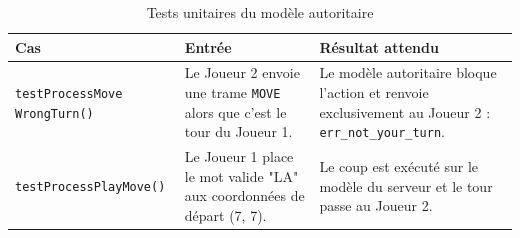 \documentclass[a4paper]{article}
\begin{document}
\begin{table}[H]
    \centering
    \small
    \begin{tabular}{p{4.5cm} p{4.5cm} p{5.5cm}}
        \toprule
        \textbf{Cas} & \textbf{Entrée} & \textbf{Résultat attendu} \\
        \midrule
        \texttt{testProcessMove WrongTurn()} & Le Joueur 2 envoie une trame \texttt{MOVE} alors que c'est le tour du Joueur 1. & Le modèle autoritaire bloque l'action et renvoie exclusivement au Joueur 2 : \texttt{err\_not\_your\_turn}. \\
        \midrule
        \texttt{testProcessPlayMove()} & Le Joueur 1 place le mot valide "LA" aux coordonnées de départ (7, 7). & Le coup est exécuté sur le modèle du serveur et le tour passe au Joueur 2. \\
        \bottomrule
    \end{tabular}
    \caption{Tests unitaires du modèle autoritaire}
\end{table}
\end{document}
